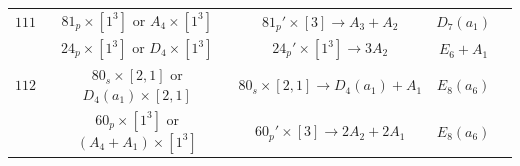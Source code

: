 \documentclass[reqno,12pt]{amsart}
\numberwithin{equation}{section}
\theoremstyle{plain}
\theoremstyle{definition}
\begin{document}
\begin{table}[htbp]
\begin{tabular}{|c|c|c|c|c|}
$ 111 $    & $81_p\times [1^3] $ or $A_4\times [1^3]$ &  $81_{p}'\times[3]\rightarrow A_3+A_2 $     &   $ D_7(a_1)$     \\ 
         &  $24_p\times [1^3] $ or $D_4\times [1^3]$ &  $24_{p}'\times[1^3]\rightarrow 3A_2 $     &   $ E_6+A_1$    \\  
         \hline
   $ 112 $  
         &  $80_s\times [2,1] $ or $D_4(a_1)\times [2,1]$ &  $80_s\times[2,1]\rightarrow D_4(a_1)+A_1 $     &   $ E_8(a_6)$  \\
         &  $60_p\times [1^3] $ or $(A_4+A_1)\times [1^3]$ &  $60_{p}'\times[3]\rightarrow 2A_2+2A_1 $     &   $ E_8(a_6)$ \\
         \hline
     
         
 \end{tabular}
	\bigskip
	
\end{table}
\end{document}
